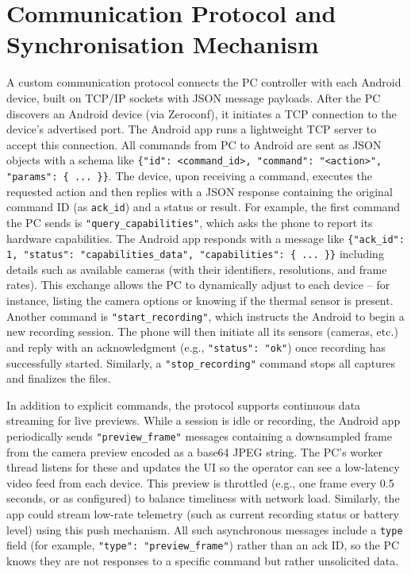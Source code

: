 \section{Communication Protocol and Synchronisation Mechanism}\label{sec:4-4}
A custom communication protocol connects the PC controller with each Android device, built on TCP/IP sockets \citep{ref21} with JSON message payloads. After the PC discovers an Android device (via Zeroconf), it initiates a TCP connection to the device's advertised port. The Android app runs a lightweight TCP server to accept this connection. All commands from PC to Android are sent as JSON objects with a schema like \texttt{\{"id": <command\_id>, "command": "<action>", "params": \{ ... \}\}}. The device, upon receiving a command, executes the requested action and then replies with a JSON response containing the original command ID (as \texttt{ack\_id}) and a status or result. For example, the first command the PC sends is \texttt{"query\_capabilities"}, which asks the phone to report its hardware capabilities. The Android app responds with a message like \texttt{\{"ack\_id": 1, "status": "capabilities\_data", "capabilities": \{ ... \}\}} including details such as available cameras (with their identifiers, resolutions, and frame rates). This exchange allows the PC to dynamically adjust to each device -- for instance, listing the camera options or knowing if the thermal sensor is present. Another command is \texttt{"start\_recording"}, which instructs the Android to begin a new recording session. The phone will then initiate all its sensors (cameras, etc.) and reply with an acknowledgment (e.g., \texttt{"status": "ok"}) once recording has successfully started. Similarly, a \texttt{"stop\_recording"} command stops all captures and finalizes the files.

In addition to explicit commands, the protocol supports continuous data streaming for live previews. While a session is idle or recording, the Android app periodically sends \texttt{"preview\_frame"} messages containing a downsampled frame from the camera preview encoded as a base64 JPEG string. The PC's worker thread listens for these and updates the UI so the operator can see a low-latency video feed from each device. This preview is throttled (e.g., one frame every 0.5 seconds, or as configured) to balance timeliness with network load. Similarly, the app could stream low-rate telemetry (such as current recording status or battery level) using this push mechanism. All such asynchronous messages include a \texttt{type} field (for example, \texttt{"type": "preview\_frame"}) rather than an ack ID, so the PC knows they are not responses to a specific command but rather unsolicited data.

